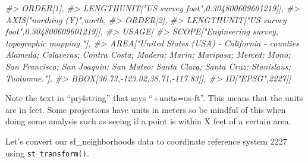 \documentclass[
]{krantz}
\makeatletter
\newenvironment{Shaded}{\begin{snugshade}}{\end{snugshade}}
\newcommand{\CommentTok}[1]{\textcolor[rgb]{0.37,0.37,0.37}{\textit{#1}}}
\newenvironment{kframe}{%
\medskip{}
\setlength{\fboxsep}{.8em}
 \def\at@end@of@kframe{}%
 \ifinner\ifhmode%
  \def\at@end@of@kframe{\end{minipage}}%
  \begin{minipage}{\columnwidth}%
 \fi\fi%
 \def\FrameCommand##1{\hskip\@totalleftmargin \hskip-\fboxsep
 \colorbox{shadecolor}{##1}\hskip-\fboxsep
     \hskip-\linewidth \hskip-\@totalleftmargin \hskip\columnwidth}%
 \MakeFramed {\advance\hsize-\width
   \@totalleftmargin\z@ \linewidth\hsize
   \@setminipage}}%
 {\par\unskip\endMakeFramed%
 \at@end@of@kframe}
\renewenvironment{Shaded}{\begin{kframe}}{\end{kframe}}
\makeatother
\begin{document}
\begin{Shaded}
\begin{Highlighting}[]
\CommentTok{\#\textgreater{}             ORDER[1],}
\CommentTok{\#\textgreater{}             LENGTHUNIT["US survey foot",0.304800609601219]],}
\CommentTok{\#\textgreater{}         AXIS["northing (Y)",north,}
\CommentTok{\#\textgreater{}             ORDER[2],}
\CommentTok{\#\textgreater{}             LENGTHUNIT["US survey foot",0.304800609601219]],}
\CommentTok{\#\textgreater{}     USAGE[}
\CommentTok{\#\textgreater{}         SCOPE["Engineering survey, topographic mapping."],}
\CommentTok{\#\textgreater{}         AREA["United States (USA) {-} California {-} counties Alameda; Calaveras; Contra Costa; Madera; Marin; Mariposa; Merced; Mono; San Francisco; San Joaquin; San Mateo; Santa Clara; Santa Cruz; Stanislaus; Tuolumne."],}
\CommentTok{\#\textgreater{}         BBOX[36.73,{-}123.02,38.71,{-}117.83]],}
\CommentTok{\#\textgreater{}     ID["EPSG",2227]]}
\end{Highlighting}
\end{Shaded}

Note the text in ``prj4string'' that says ``+units=us-ft''. This means that the units are in feet. Some projections have units in meters so be mindful of this when doing some analysis such as seeing if a point is within X feet of a certain area.

Let's convert our sf\_neighborhoods data to coordinate reference system 2227 using \texttt{st\_transform()}.
\end{document}
